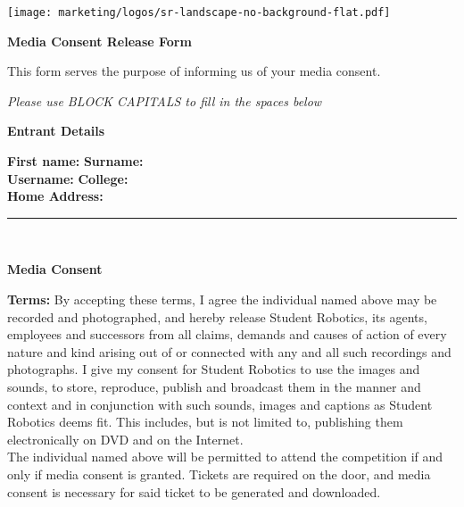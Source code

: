 \documentclass[a4paper,10pt]{article}
\newcommand{\textfield}[1]{\textbf{#1:} \hrulefill\hspace{0mm}}
\newcommand{\fieldsep}{\\[2.5mm]}
\newcommand{\textfieldline}{{\hrule\hspace{2mm}\fieldsep}}
\begin{document}
\pagestyle{fancy}

\begin{minipage}[c]{0.38\textwidth}
\texttt{[image: marketing/logos/sr-landscape-no-background-flat.pdf]}
\end{minipage}
\hspace{0.12\textwidth}
\begin{minipage}[c]{0.48\textwidth}
\begin{center}
{\LARGE \textbf{Media Consent Release Form} \par}
\end{center}
\end{minipage}
\vspace{1cm}

This form serves the purpose of informing us of your media consent.
\begin{center}
\textit{Please use BLOCK CAPITALS to fill in the spaces below}
\end{center}

\textbf{\large Entrant Details}\\\vspace{-2mm}

\textfield{First name}  \textfield{Surname} \fieldsep
\textfield{Username} \textfield{College} \fieldsep
\textfield{Home Address} \fieldsep
\textfieldline


\textbf{\large Media Consent}\\\vspace{-3mm}

\textbf{Terms:} By accepting these terms, I agree the individual named above may be recorded and photographed, and hereby release Student Robotics, its agents, employees and successors from all claims, demands and causes of action of every nature and kind arising out of or connected with any and all such recordings and photographs.
I give my consent for Student Robotics to use the images and sounds, to store, reproduce, publish and broadcast them in the manner and context and in conjunction with such sounds, images and captions as Student Robotics deems fit.
This includes, but is not limited to, publishing them electronically on DVD and on the Internet.\\

The individual named above will be permitted to attend the competition if and only if media consent is granted.
Tickets are required on the door, and media consent is necessary for said ticket to be generated and downloaded.\\
\end{document}
